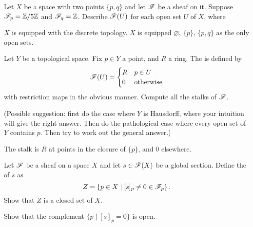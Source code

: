 \begin{problem}
	\label{prob:finite_sheaf}
	Let $X$ be a space with two points $\{p,q\}$
	and let $\mathscr F$ be a sheaf on it.
	Suppose $\mathscr F_p = \mathbb Z/5\mathbb Z$ and $\mathscr F_q = \mathbb Z$.
	Describe $\mathscr F(U)$ for each open set $U$ of $X$, where
	\begin{enumerate}[(a)]
		\ii $X$ is equipped with the discrete topology.
		\ii $X$ is equipped $\varnothing$, $\{p\}$, $\{p,q\}$
		as the only open sets.
	\end{enumerate}
\end{problem}

\begin{problem}
	Let $Y$ be a topological space.
	Fix $p \in Y$ a point, and $R$ a ring.
	The  is defined by
	\[
		\mathscr F(U) = \begin{cases}
			R & p \in U \\
			0 & \text{otherwise}
		\end{cases}
	\]
	with restriction maps in the obvious manner.
	Compute all the stalks of $\mathscr F$.

	(Possible suggestion: first do the case where $Y$ is Hausdorff,
	where your intuition will give the right answer.
	Then do the pathological case where every open set of $Y$ contains $p$.
	Then try to work out the general answer.)
	\begin{hint}
		The stalk is $R$ at points in the closure of $\{p\}$, and $0$ elsewhere.
	\end{hint}
\end{problem}

\begin{problem}
	Let $\mathscr F$ be a sheaf on a space $X$ and let $s \in \mathscr F(X)$
	be a global section.
	Define the  of $s$ as
	\[ Z = \left\{ p \in X \mid [s]_p \neq 0 \in \mathscr F_p \right\}. \]
	Show that $Z$ is a closed set of $X$.
	\begin{hint}
		Show that the complement $\{ p \mid [s]_p = 0 \}$ is open.
	\end{hint}
\end{problem}

%

